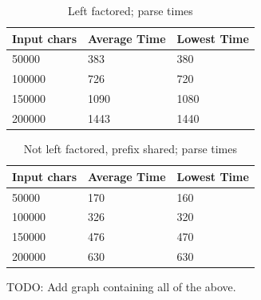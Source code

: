 \documentclass[a4paper,10pt]{article}
\begin{document}
\begin{table}[H]
\centering
\begin{tabular}{ | p{5em} | p{7em} | p{6em} | }
  \hline
  Input chars & Average Time & Lowest Time \\
  \hline
  50000 & 383 & 380 \\
  100000 & 726 & 720 \\
  150000 & 1090 & 1080 \\
  200000 & 1443 & 1440 \\
  \hline
\end{tabular}
\caption{Left factored; parse times}
\end{table}

\begin{table}[H]
\centering
\begin{tabular}{ | p{5em} | p{7em} | p{6em} | }
  \hline
  Input chars & Average Time & Lowest Time \\
  \hline
  50000 & 170 & 160 \\
  100000 & 326 & 320 \\
  150000 & 476 & 470 \\
  200000 & 630 & 630 \\
  \hline
\end{tabular}
\caption{Not left factored, prefix shared; parse times}
\end{table}

TODO: Add graph containing all of the above.
\end{document}
